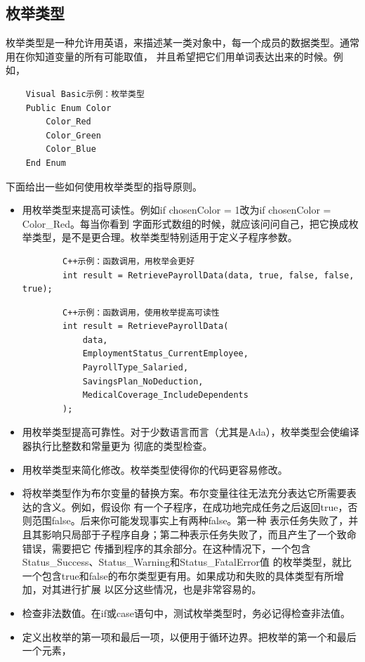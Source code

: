 \documentclass{article}
\begin{document}
\subsection{枚举类型}
枚举类型是一种允许用英语，来描述某一类对象中，每一个成员的数据类型。通常用在你知道变量的所有可能取值，
并且希望把它们用单词表达出来的时候。例如，
\begin{lstlisting}
    Visual Basic示例：枚举类型
    Public Enum Color
        Color_Red
        Color_Green
        Color_Blue
    End Enum
\end{lstlisting}
下面给出一些如何使用枚举类型的指导原则。
\begin{itemize}
    \item 用枚举类型来提高可读性。例如if chosenColor = 1改为if chosenColor = Color\_Red。每当你看到
    字面形式数组的时候，就应该问问自己，把它换成枚举类型，是不是更合理。枚举类型特别适用于定义子程序参数。
    \begin{lstlisting}
        C++示例：函数调用，用枚举会更好
        int result = RetrievePayrollData(data, true, false, false, true);
    \end{lstlisting}
    \begin{lstlisting}
        C++示例：函数调用，使用枚举提高可读性
        int result = RetrievePayrollData(
            data,
            EmploymentStatus_CurrentEmployee,
            PayrollType_Salaried,
            SavingsPlan_NoDeduction,
            MedicalCoverage_IncludeDependents
        );
    \end{lstlisting}
    \item 用枚举类型提高可靠性。对于少数语言而言（尤其是Ada），枚举类型会使编译器执行比整数和常量更为
    彻底的类型检查。
    \item 用枚举类型来简化修改。枚举类型使得你的代码更容易修改。
    \item 将枚举类型作为布尔变量的替换方案。布尔变量往往无法充分表达它所需要表达的含义。例如，假设你
    有一个子程序，在成功地完成任务之后返回true，否则范围false。后来你可能发现事实上有两种false。第一种
    表示任务失败了，并且其影响只局部于子程序自身；第二种表示任务失败了，而且产生了一个致命错误，需要把它
    传播到程序的其余部分。在这种情况下，一个包含Status\_Success、Status\_Warning和Status\_FatalError值
    的枚举类型，就比一个包含true和false的布尔类型更有用。如果成功和失败的具体类型有所增加，对其进行扩展
    以区分这些情况，也是非常容易的。
    \item 检查非法数值。在if或case语句中，测试枚举类型时，务必记得检查非法值。
    \item 定义出枚举的第一项和最后一项，以便用于循环边界。把枚举的第一个和最后一个元素，

\end{itemize}
\end{document}
